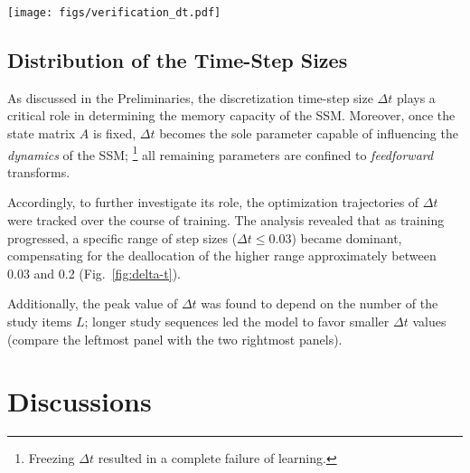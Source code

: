 \documentclass[10pt,letterpaper]{article}
\begin{document}
\begin{figure*}
	\centering
	\texttt{[image: figs/verification\_dt.pdf]}
	\caption{Top row: Optimization trajectories of the discretization step size $\Delta t$ in the SSM (S4) model with frozen Legendre state and input matrices. Each heatmap column represents the distribution of $\Delta t$ across 256 latent channels $\times$ 10 training runs, sorted in the ascending order.
	Bottom row: Histograms displaying the initial (blue) and final (orange) values of $\Delta t$, aggregated across the 256 latent channels $\times$ 10 training runs (see Fig.~\ref{fig:delta-t_per-seed} in the Appendix for variations among individual runs).
	The first to third panel columns from the left show the results for three different ranges of log-uniformly random initializations, whereas the fourth and fifth columns tested shorter and longer study items, respectively.
	}
	\label{fig:delta-t}
\end{figure*}


\subsection{Distribution of the Time-Step Sizes}

As discussed in the Preliminaries, the discretization time-step size $\Delta t$ plays a critical role in determining the memory capacity of the SSM.
Moreover, once the state matrix $A$ is fixed, $\Delta t$ becomes the sole parameter capable of influencing the \emph{dynamics} of the SSM;%
\footnote{
	Freezing $\Delta t$ resulted in a complete failure of learning.}
all remaining parameters are confined to \emph{feedforward} transforms.

Accordingly, to further investigate its role, the optimization trajectories of $\Delta t$ were tracked over the course of training.
The analysis revealed that as training progressed, a specific range of step sizes ($\Delta t \leq 0.03$) became dominant, compensating for the deallocation of the higher range approximately between 0.03 and 0.2 (Fig.~\ref{fig:delta-t}).

Additionally, the peak value of $\Delta t$ was found to depend on the number of the study items $L$; longer study sequences led the model to favor smaller $\Delta t$ values (compare the leftmost panel with the two rightmost panels).



\section{Discussions}
\end{document}
